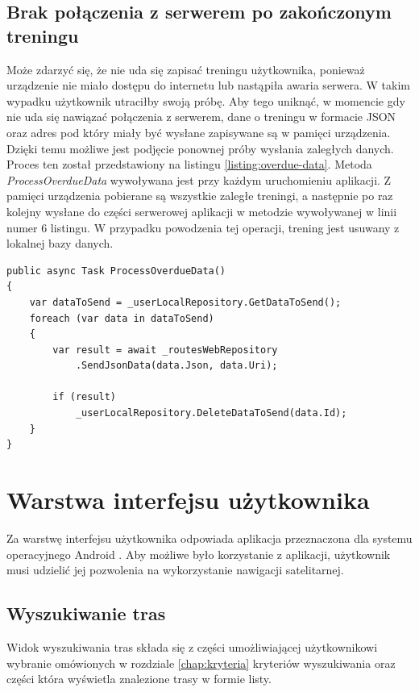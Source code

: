 \subsection{Brak połączenia z serwerem po zakończonym treningu}
Może zdarzyć się, że nie uda się zapisać treningu użytkownika, ponieważ urządzenie nie miało dostępu do internetu lub nastąpiła awaria serwera. W takim wypadku użytkownik utraciłby swoją próbę. Aby tego uniknąć, w momencie gdy nie uda się nawiązać połączenia z serwerem, dane o treningu w formacie JSON oraz adres pod który miały być wysłane zapisywane są w pamięci urządzenia. Dzięki temu możliwe jest podjęcie ponownej próby wysłania zaległych danych. Proces ten został przedstawiony na listingu \ref{listing:overdue-data}. Metoda \textit{ProcessOverdueData} wywoływana jest przy każdym uruchomieniu aplikacji. Z pamięci urządzenia pobierane są wszystkie zaległe treningi, a następnie po raz kolejny wysłane do części serwerowej aplikacji w metodzie wywoływanej w linii numer 6 listingu. W przypadku powodzenia tej operacji, trening jest usuwany z lokalnej bazy danych.
\begin{lstlisting}[caption={Wyznaczenie poziomu terenu},label=listing:overdue-data]
public async Task ProcessOverdueData()
{
    var dataToSend = _userLocalRepository.GetDataToSend();
    foreach (var data in dataToSend)
    {
        var result = await _routesWebRepository
        	.SendJsonData(data.Json, data.Uri);

        if (result)
            _userLocalRepository.DeleteDataToSend(data.Id);
    }
}
\end{lstlisting}

\section{Warstwa interfejsu użytkownika}
Za warstwę interfejsu użytkownika odpowiada aplikacja przeznaczona dla systemu operacyjnego Android \cite{android}. Aby możliwe było korzystanie z aplikacji, użytkownik musi udzielić jej pozwolenia na wykorzystanie nawigacji satelitarnej. 
\subsection{Wyszukiwanie tras}
Widok wyszukiwania tras składa się z części umożliwiającej użytkownikowi wybranie omówionych w rozdziale \ref{chap:kryteria} kryteriów wyszukiwania oraz części która wyświetla znalezione trasy w formie listy.

